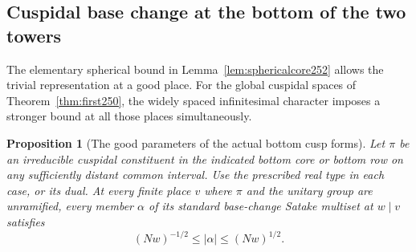 \documentclass[a4paper,11pt]{article}
\newtheorem{proposition}{Proposition}[section]
\theoremstyle{definition}
\theoremstyle{remark}
\numberwithin{equation}{section}
\begin{document}
\subsection{Cuspidal base change at the bottom of the two towers}\label{nav:VIII-39}
The elementary spherical bound in Lemma~\ref{lem:sphericalcore252}
allows the trivial representation at a good place. For the global
cuspidal spaces of Theorem~\ref{thm:first250}, the widely spaced
infinitesimal character imposes a stronger bound at all those
places simultaneously.

\begin{proposition}[The good parameters of the actual bottom cusp forms]\leavevmode
\label{prop:basechange258}
Let \(\pi\) be an irreducible cuspidal constituent in the indicated
bottom core or bottom row on any sufficiently distant common
interval. Use the prescribed real type in each case, or its dual.
At every finite place \(v\) where \(\pi\) and the unitary group are
unramified, every member \(\alpha\) of its standard base-change
Satake multiset at \(w\mid v\) satisfies
\[
               (Nw)^{-1/2}\le|\alpha|\le(Nw)^{1/2}.
\]
\end{proposition}
\end{document}
